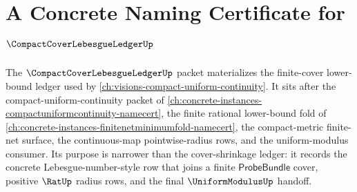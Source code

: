 \chapter{A Concrete Naming Certificate for $\CompactCoverLebesgueLedgerUp$}
\label{ch:concrete-instances-compact-cover-lebesgue-ledger-namecert}

The $\CompactCoverLebesgueLedgerUp$ packet materializes the finite-cover lower-bound ledger used by \autoref{ch:visions-compact-uniform-continuity}. It sits after the compact-uniform-continuity packet of \autoref{ch:concrete-instances-compactuniformcontinuity-namecert}, the finite rational lower-bound fold of \autoref{ch:concrete-instances-finitenetminimumfold-namecert}, the compact-metric finite-net surface, the continuous-map pointwise-radius rows, and the uniform-modulus consumer. Its purpose is narrower than the cover-shrinkage ledger: it records the concrete Lebesgue-number-style row that joins a finite $\mathsf{ProbeBundle}$ cover, positive $\RatUp$ radius rows, and the final $\UniformModulusUp$ handoff.

